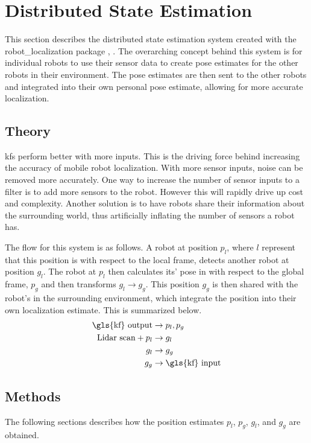\documentclass[thesis.tex]{subfile}
\begin{document}
\chapter{Distributed State Estimation} \label{Distributed State Estimation}
This section describes the distributed state estimation system created with the robot\_localization package \cite{MooreStouch2014}, \cite{Moore}. The overarching concept behind this system is for individual robots to use their sensor data to create pose estimates for the other robots in their environment. The pose estimates are then sent to the other robots and integrated into their own personal pose estimate, allowing for more accurate localization.
  
\section{Theory} \label{Theory}
\glspl{kf} perform better with more inputs. This is the driving force behind increasing the accuracy of mobile robot localization. With more sensor inputs, noise can be removed more accurately. One way to increase the number of sensor inputs to a filter is to add more sensors to the robot. However this will rapidly drive up cost and complexity. Another solution is to have robots share their information about the surrounding world, thus artificially inflating the number of sensors a robot has.

The flow for this system is as follows. A robot at position $p_l$, where $l$ represent that this position is with respect to the local frame, detects another robot at position $g_l$. The robot at $p_l$ then calculates its' pose in with respect to the global frame, $p_g$ and then transforms $g_l \rightarrow g_g$. This position $g_g$ is then shared with the robot's in the surrounding environment, which integrate the position into their own localization estimate. This is summarized below.
\begin{align}
\text{\gls{kf} output} &\rightarrow p_l, p_g \\
\text{Lidar scan} + p_l &\rightarrow g_l \\
g_l &\rightarrow g_g \\
g_g &\rightarrow \text{\gls{kf} input}
\end{align}

\section{Methods}
The following sections describes how the position estimates $p_l$, $p_g$, $g_l$, and $g_g$ are obtained.
\end{document}
